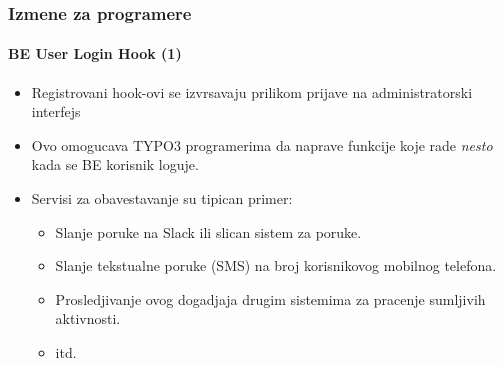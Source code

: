 
\begin{frame}[fragile]
	\frametitle{Izmene za programere}
	\framesubtitle{BE User Login Hook (1)}

	\lstset{basicstyle=\tiny\ttfamily}

	\begin{itemize}
		\item Registrovani hook-ovi se izvrsavaju prilikom prijave na administratorski interfejs
		\item Ovo omogucava TYPO3 programerima da naprave funkcije koje rade 
			\textit{nesto} kada se BE korisnik loguje.

		\item Servisi za obavestavanje su tipican primer:

			\begin{itemize}
				\item Slanje poruke na Slack ili slican sistem za poruke.
				\item Slanje tekstualne poruke (SMS) na broj korisnikovog mobilnog telefona.
				\item Prosledjivanje ovog dogadjaja drugim sistemima za pracenje sumljivih aktivnosti.
				\item itd.
			\end{itemize}

	\end{itemize}

\end{frame}



